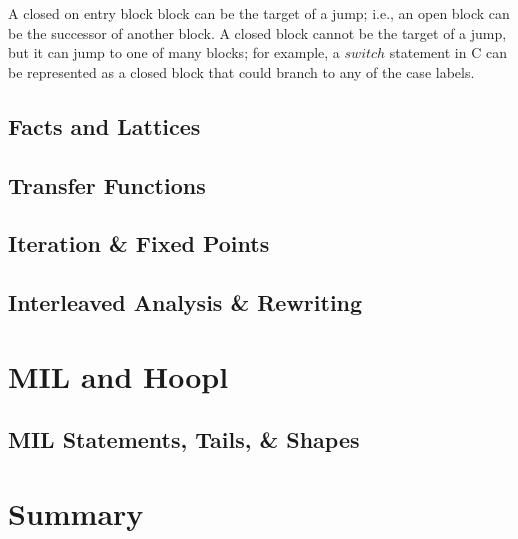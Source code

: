 \documentclass[12pt]{report}
\newcommand{\Varid}[1]{\mathit{#1}}
\begin{document}
A closed on entry
block block can be the target of a jump; i.e., an open block can be
the successor of another block. A closed block cannot be the target of
a jump, but it can jump to one of many blocks; for example, a \ensuremath{\Varid{switch}}
statement in C can be represented as a closed block that could branch
to any of the case labels.

\subsection*{Facts and Lattices}

\subsection*{Transfer Functions}

\subsection*{Iteration \& Fixed Points}

\subsection*{Interleaved Analysis \& Rewriting}

\section{MIL and Hoopl}
\label{hoopl_sec2}

\subsection{MIL Statements, Tails, \& Shapes}

\section{Summary}
\label{hoopl_sec3}

\standaloneBib
\end{document}
